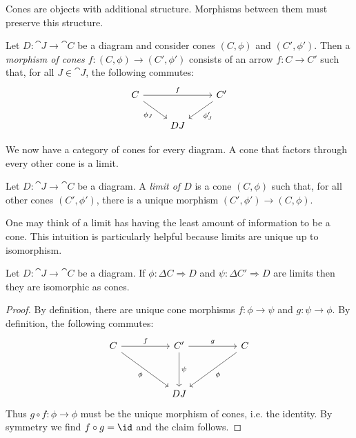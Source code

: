 \documentclass{article}
\begin{document}
Cones are objects with additional structure. Morphisms between them must preserve
this structure.

\begin{definition}
  Let $D:\cat{J}\to\cat{C}$ be a diagram and consider cones $(C,\phi)$ and
  $(C',\phi')$. Then a \emph{morphism of cones $f:(C,\phi)\to(C',\phi')$} consists of
  an arrow $f:C\to C'$ such that, for all $J\in\cat{J}$, the following
  commutes:
  \begin{equation}
    \begin{tikzcd}
      C && {C'} \\
        & DJ
        \arrow["f", from=1-1, to=1-3]
        \arrow["{\phi_J'}", from=1-3, to=2-2]
        \arrow["{\phi_J}"', from=1-1, to=2-2]
    \end{tikzcd}
  \end{equation}
\end{definition}

We now have a category of cones for every diagram.
A cone that factors through every other cone is a limit.

\begin{definition}
  Let $D:\cat{J}\to\cat{C}$ be a diagram. A \emph{limit of $D$} is a cone
  $(C,\phi)$ such that, for all other cones $(C',\phi')$, there is a unique morphism
  $(C',\phi')\to(C,\phi)$.
\end{definition}

One may think of a limit has having the least amount of information to be a cone.
This intuition is particularly helpful because limits are unique up to isomorphism.

\begin{proposition}\label{prop:limits_are_unique}
  Let $D:\cat{J}\to\cat{C}$ be a diagram. If $\phi:\Delta C\Rightarrow D$
  and $\psi:\Delta C'\Rightarrow D$ are limits then they are isomorphic as cones.
  \begin{proof}
    By definition, there are unique cone morphisms $f:\phi\to\psi$ and
    $g:\psi\to\phi$. By definition, the following commutes:
    \begin{equation}
      \begin{tikzcd}
        C && {C'} && C \\
        \\
          && DJ
          \arrow["f", from=1-1, to=1-3]
          \arrow["\psi", from=1-3, to=3-3]
          \arrow["\phi"', from=1-1, to=3-3]
          \arrow["\phi", from=1-5, to=3-3]
          \arrow["g", from=1-3, to=1-5]
      \end{tikzcd}
    \end{equation}
    Thus $g\circ f:\phi\to\phi$ must be the unique morphism of cones, i.e.
    the identity. By symmetry we find $f\circ g=\id$ and the claim follows.
  \end{proof}
\end{proposition}
\end{document}
